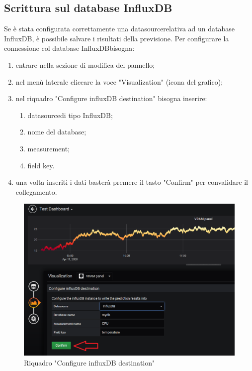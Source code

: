     \subsection{Scrittura sul database InfluxDB}
        Se è stata configurata correttamente una datasource\glosp relativa ad un database InfluxDB\glo, è possibile salvare i risultati della previsione. Per configurare la connessione col database InfluxDB\glosp bisogna:
        \begin{enumerate}
            \item entrare nella sezione di modifica del pannello;
            \item nel menù laterale cliccare la voce "Visualization" (icona del grafico);
            \item nel riquadro "Configure influxDB destination" bisogna inserire:
            \begin{enumerate}
                \item datasource\glosp di tipo InfluxDB\glo;
                \item nome del database;
                \item measurement;
                \item field key.
            \end{enumerate}
            \item una volta inseriti i dati basterà premere il tasto "Confirm" per convalidare il collegamento.
        \end{enumerate}
        \begin{figure}[H]
            \includegraphics[width=\textwidth,height=\textheight,keepaspectratio]{img/scrittura_InfluxDB.png}
            \caption{Riquadro "Configure influxDB destination"}
        \end{figure}
